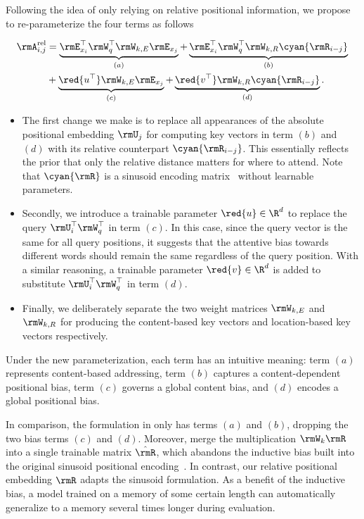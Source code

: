 Following the idea of only relying on relative positional information, we propose to re-parameterize the four terms as follows
\par\nobreak
\vspace{-0.5em}
\small
\begin{align*}
	\rmA_{i,j}^\text{rel}
	&= \underbrace{ \rmE_{x_i}^\top \rmW_q^\top \rmW_{k,E} \rmE_{x_j} }_{(a)}
	+ \underbrace{\rmE_{x_i}^\top \rmW_q^\top \rmW_{k,R} \cyan{\rmR_{i-j}} }_{(b)} \\
	&+ \underbrace{\red{u^\top} \rmW_{k,E} \rmE_{x_j}}_{(c)}
	+ \underbrace{\red{v^\top} \rmW_{k,R} \cyan{\rmR_{i-j}}}_{(d)}.
\end{align*}
\normalsize
\vspace{-1em}

\begin{itemize}[leftmargin=*,itemsep=0pt,parsep=0.5em,topsep=0pt,partopsep=0pt]
	\item The first change we make is to replace all appearances of the absolute positional embedding $\rmU_{j}$ for computing key vectors in term $(b)$ and $(d)$ with its relative counterpart $\cyan{\rmR_{i-j}}$.
	This essentially reflects the prior that only the relative distance matters for where to attend.
	Note that $\cyan{\rmR}$ is a sinusoid encoding matrix~\citep{vaswani2017attention} without learnable parameters.
	\item Secondly, we introduce a trainable parameter $\red{u} \in \R^{d}$ to replace the query $\rmU_{i}^\top \rmW_q^\top$ in term $(c)$.
	In this case, since the query vector is the same for all query positions, it suggests that the attentive bias towards different words should remain the same regardless of the query position.
	With a similar reasoning, a trainable parameter $\red{v} \in \R^{d}$ is added to substitute $\rmU_{i}^\top \rmW_q^\top$ in term $(d)$.
	\item Finally, we deliberately separate the two weight matrices $\rmW_{k,E}$ and $\rmW_{k,R}$ for producing the content-based key vectors and location-based key vectors respectively.
\end{itemize}
Under the new parameterization, each term has an intuitive meaning: term $(a)$ represents content-based addressing, term $(b)$ captures a content-dependent positional bias, term $(c)$ governs a global content bias, and $(d)$ encodes a global positional bias.

In comparison, the formulation in \citet{shaw2018self} only has terms $(a)$ and $(b)$, dropping the two bias terms $(c)$ and $(d)$.
Moreover, \citet{shaw2018self} merge the multiplication $\rmW_k \rmR$ into a single trainable matrix $\hat{\rmR}$, which abandons the inductive bias built into the original sinusoid positional encoding~\citep{vaswani2017attention}.
In contrast, our relative positional embedding $\rmR$ adapts the sinusoid formulation.
As a benefit of the inductive bias, a model trained on a memory of some certain length can automatically generalize to a memory several times longer during evaluation.

